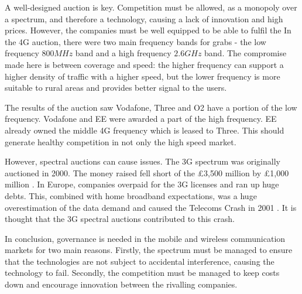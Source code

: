 A well-designed auction is key. 
Competition must be allowed, as a monopoly over a spectrum, and therefore a technology, causing a lack of innovation and high prices. 
However, the companies must be well equipped to be able to fulfil the 
In the 4G auction, there were two main frequency bands for grabs - the low frequency $800MHz$ band and a high frequency $2.6GHz$ band. 
The compromise made here is between coverage and speed: the higher frequency can support a higher density of traffic with a higher speed, but the lower frequency is more suitable to rural areas and provides better signal to the users.

The results of the auction saw Vodafone, Three and O2 have a portion of the low frequency. 
Vodafone and EE were awarded a part of the high frequency.
EE already owned the middle 4G frequency which is leased to Three. 
This should generate healthy competition in not only the high speed market. 

However, spectral auctions can cause issues.
The 3G spectrum was originally auctioned in 2000. 
The money raised fell short of the \pounds 3,500 million by \pounds 1,000 million \cite{telecom}.
In Europe, companies overpaid for the 3G licenses and ran up huge debts.
This, combined with home broadband expectations, was a huge overestimation of the data demand and caused the Telecoms Crash in 2001 \cite{telecom:crash}.
It is thought that the 3G spectral auctions contributed to this crash.

In conclusion, governance is needed in the mobile and wireless communication markets for two main reasons.
Firstly, the spectrum must be managed to ensure that the technologies are not subject to accidental interference, causing the technology to fail. 
Secondly, the competition must be managed to keep costs down and encourage innovation between the rivalling companies. 


